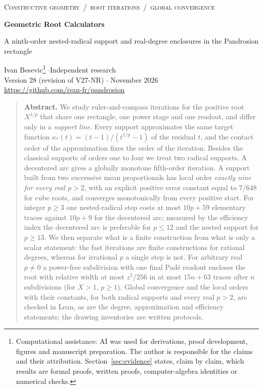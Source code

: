 \documentclass[10pt,a4paper]{article}
\theoremstyle{plain}
\theoremstyle{remark}
\numberwithin{equation}{section}
\begin{document}
{\small\scshape Constructive geometry \,/\, root iterations \,/\, global convergence}

\vspace{6pt}
{\LARGE\bfseries Geometric Root Calculators\par}
\vspace{3pt}
{\large A ninth-order nested-radical support and real-degree enclosures in the Pandrosion rectangle\par}
\vspace{8pt}
Ivan Besevic\footnote{Computational assistance: AI was used for derivations, proof development,
figures and manuscript preparation. The author is responsible for the claims and their attribution.
Section~\ref{sec:evidence} states, claim by claim, which results are formal proofs, written proofs,
computer-algebra identities or numerical checks.}
\quad$\cdot$\quad Independent research\\
Version 28 (revision of V27-NR) \quad$\cdot$ November 2026\\
\url{https://github.com/ivan-fr/pandrosion}

\vspace{6pt}
\begin{quote}\small
\textbf{Abstract.}
We study ruler-and-compass iterations for the positive root $X^{1/p}$ that share one rectangle, one
power stage and one readout, and differ only in a \emph{support line}. Every support approximates the
same target function $\kappa_*(t)=(t-1)/(t^{1/p}-1)$ of the residual $t$, and the contact order of the
approximation fixes the order of the iteration. Besides the classical supports of orders one to four we
treat two radical supports. A decentered arc gives a globally monotone fifth-order iteration. A support
built from two successive mean proportionals has local order \emph{exactly nine for every real $p>2$},
with an explicit positive error constant equal to $7/648$ for cube roots, and converges monotonically
from every positive start. For integer $p\ge 3$ one nested-radical step costs at most $10p+59$
elementary traces against $10p+9$ for the decentered arc; measured by the efficiency index the
decentered arc is preferable for $p\le 12$ and the nested support for $p\ge 13$. We then separate what
is a finite construction from what is only a scalar statement: the fast iterations are finite
constructions for rational degrees, whereas for irrational $p$ a single step is not. For arbitrary real
$p\neq 0$ a power-free subdivision with one final Pad\'e readout encloses the root with relative width at
most $z^5/256$ in at most $15n+63$ traces after $n$ subdivisions (for $X>1$, $p\ge 1$). Global
convergence and the local orders with their constants, for both radical supports and every real
$p>2$, are checked in Lean, as are the degree, approximation and efficiency statements; the drawing
inventories are written protocols.
\end{quote}
\end{document}
